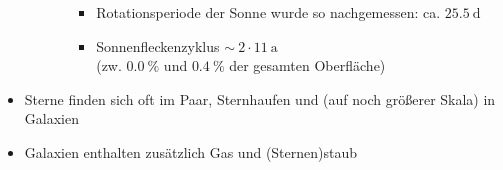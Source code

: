 \begin{itemize}[label={$\to$}]
\begin{itemize}[label={$\bullet$}]
\begin{enumerate}[label={(\alph*)}]
\begin{itemize}[label={$\to$}]
							\item Rotationsperiode der Sonne wurde so nachgemessen: ca. $\SI{25.5}{\text{d}}$
							\item Sonnenfleckenzyklus $\sim \ 2\cdot\SI{11}{\text{a}}$\\
								(zw. $\SI{0.0}{\%}$ und $\SI{0.4}{\%}$ der gesamten Oberfläche)
						\end{itemize}
				\end{enumerate}
		\end{itemize}
	\item Sterne finden sich oft im Paar, Sternhaufen und (auf noch größerer Skala) in Galaxien
	\item Galaxien enthalten zusätzlich Gas und (Sternen)staub
\end{itemize}
